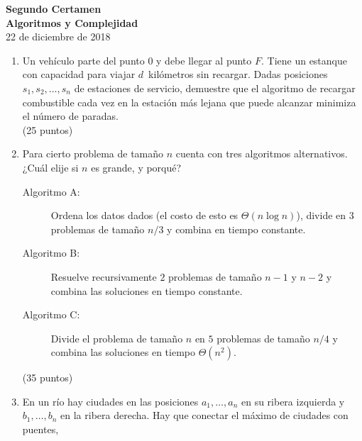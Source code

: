 \documentclass[english, spanish, fleqn]{article}
\begin{document}
\pagestyle{empty}
  \begin{center}
    {\huge\textbf{Segundo Certamen\\[0.25\baselineskip]
                  Algoritmos y Complejidad}}\\
    \vspace{0.5\baselineskip}
    {\large 22 de diciembre de 2018}
  \end{center}
  \vspace{2mm}
  \begin{center}
  \end{center}
  \vspace{2.5mm}
  \begin{enumerate}
  \item %
    Un vehículo parte del punto \(0\) y debe llegar al punto \(F\).
    Tiene un estanque con capacidad para viajar \(d\)~kilómetros sin recargar.
    Dadas posiciones \(s_1, s_2, \dotsc, s_n\) de estaciones de servicio,
    demuestre que el algoritmo
    de recargar combustible cada vez en la estación más lejana
    que puede alcanzar
    minimiza el número de paradas.
    \\ \hspace*{\fill}(25 puntos)
  \item %
    Para cierto problema de tamaño \(n\)
    cuenta con tres algoritmos alternativos.
    ¿Cuál elije si \(n\) es grande,
    y porqué?
    \begin{description}
    \item[Algoritmo A:]
      Ordena los datos dados
      (el costo de esto es \(\Theta(n \log n)\)),
      divide en \(3\) problemas de tamaño \(n / 3\)
      y combina en tiempo constante.
    \item[Algoritmo B:]
      Resuelve recursivamente \(2\) problemas de tamaño \(n - 1\) y \(n - 2\)
      y combina las soluciones en tiempo constante.
    \item[Algoritmo C:]
      Divide el problema de tamaño \(n\)
      en \(5\) problemas de tamaño \(n / 4\)
      y combina las soluciones en tiempo \(\Theta(n^2)\).
    \end{description}
    \hspace*{\fill}(35 puntos)
  \item %
    En un río hay ciudades
    en las posiciones \(a_1, \dotsc, a_n\) en su ribera izquierda
    y \(b_1, \dotsc, b_n\) en la ribera derecha.
    Hay que conectar el máximo de ciudades con puentes,

\end{enumerate}
\end{document}
